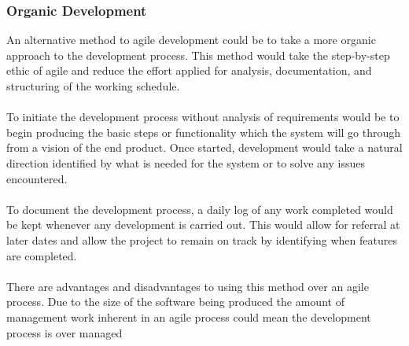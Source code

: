 		\subsubsection{Organic Development}
			An alternative method to agile development could be to take a more organic approach to the development process. This method would take the step-by-step ethic of agile and reduce the effort applied for analysis, documentation, and structuring of the working schedule.
			\\\\
			To initiate the development process without analysis of requirements would be to begin producing the basic steps or functionality which the system will go through from a vision of the end product. Once started, development would take a natural direction identified by what is needed for the system or to solve any issues encountered.
			\\\\
			To document the development process, a daily log of any work completed would be kept  whenever any development is carried out. This would allow for referral at later dates and allow the project to remain on track by identifying when features are completed.
			\\\\
			There are advantages and disadvantages to using this method over an agile process. Due to the size of the software being produced the amount of management work inherent in  an agile process could mean the development process is over managed
